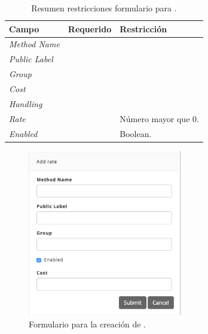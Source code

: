 \begin{table}[H]
    \centering
	\begin{tabular}{ |l|c||l| }
		\hline Campo & Requerido & Restricción \\ \hline
		\multirow{1}{*}{\textit{Method Name}} 	&  \checkmark 	& \\ \hline
		\multirow{1}{*}{\textit{Public Label}} 	&  \checkmark	& \\ \hline
		\multirow{1}{*}{\textit{Group}} 		&  \checkmark	& \\ \hline
		\multirow{1}{*}{\textit{Cost}} 			&  				& \\ \hline
		\multirow{1}{*}{\textit{Handling}} 		&  				& \\ \hline
		\multirow{1}{*}{\textit{Rate}} 			&  \checkmark	& Número mayor que 0. \\ \hline
		\multirow{1}{*}{\textit{Enabled}} 		&  \checkmark	& Boolean. \\ \hline
		\hline
	\end{tabular}
 	\caption{Resumen restricciones formulario para \shippingEF.}
    \label{tab:dashboard:shipping:form:restrictions:shipping}
\end{table}

\begin{figure}[H]
	\centering
	\includegraphics[width=0.6\textwidth]{figuras/dashboard/shipping/form_shipping_add.png}
	\caption{Formulario para la creación de \shippingEF.}
	\label{figure:dashboard:shipping:form_shipping_add}
\end{figure}



